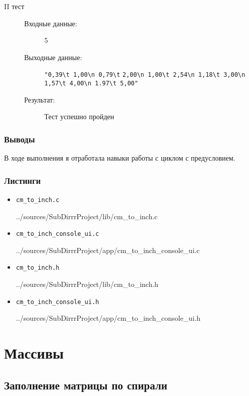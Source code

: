 \documentclass[12pt,a4paper]{report}
\begin{document}
\begin{enumerate}
\begin{description}
\item[II тест]
\hspace{\parindent}
\begin{flushleft}
\begin{description}
\item[Входные данные:] 5
\item[Выходные данные:] \verb/"0,39\t 1,00\n 0,79\t/
\verb/2,00\n 1,00\t 2,54\n 1,18\t 3,00\n 1,57\t 4,00\n 1.97\t 5,00"/ 
\item[Результат:] Тест успешно пройден
\end{description}
\end{flushleft}
\end{description}

\end{enumerate}
\subsection{Выводы}
\hspace{\parindent}
В ходе выполнения я отработала навыки работы с циклом с предусловием. 
\subsection*{Листинги}
\begin{itemize}
\item[] \verb-cm_to_inch.c-

{../sources/SubDirrrProject/lib/cm_to_inch.c}
\item[] \verb-cm_to_inch_console_ui.c-

{../sources/SubDirrrProject/app/cm_to_inch_console_ui.c}
\item[] \verb-cm_to_inch.h-

{../sources/SubDirrrProject/lib/cm_to_inch.h}
\item[] \verb-cm_to_inch_console_ui.h-

{../sources/SubDirrrProject/app/cm_to_inch_console_ui.h}
\end{itemize}

%
\chapter{Массивы}
\section{Заполнение матрицы по спирали}
\end{document}
